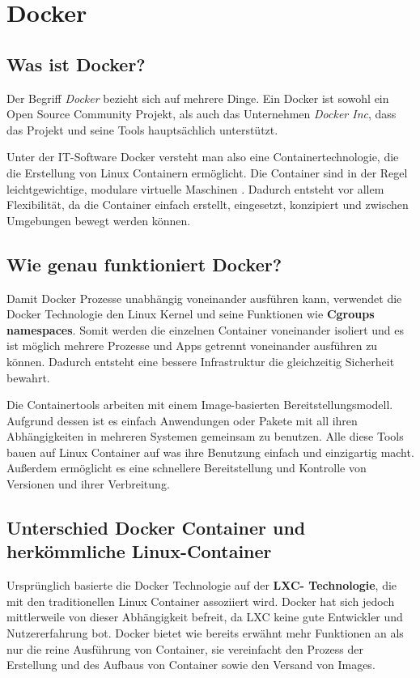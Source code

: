 \section{Docker}
\subsection{Was ist Docker?}
Der Begriff \textit{Docker} bezieht sich auf mehrere Dinge. Ein Docker ist sowohl ein Open Source
Community Projekt, als auch das Unternehmen \textit{Docker Inc}, dass das Projekt und seine Tools
hauptsächlich unterstützt.

Unter der IT-Software Docker versteht man also eine Containertechnologie, die die Erstellung von Linux
Containern ermöglicht. Die Container sind in der Regel leichtgewichtige, modulare virtuelle Maschinen
. Dadurch entsteht vor allem Flexibilität, da die Container einfach erstellt, eingesetzt, konzipiert
und zwischen Umgebungen bewegt werden können.

\subsection{Wie genau funktioniert Docker?}
Damit Docker Prozesse unabhängig voneinander ausführen kann, verwendet die Docker Technologie
den Linux Kernel und seine Funktionen wie \textbf{Cgroups} \textbf{namespaces}. Somit werden die
einzelnen Container voneinander isoliert und es ist möglich mehrere Prozesse und Apps getrennt
voneinander ausführen zu können. Dadurch entsteht eine bessere Infrastruktur die gleichzeitig
Sicherheit bewahrt.

Die Containertools arbeiten mit einem Image-basierten Bereitstellungsmodell. Aufgrund dessen ist es
einfach Anwendungen oder Pakete mit all ihren Abhängigkeiten in mehreren Systemen gemeinsam zu benutzen.
Alle diese Tools bauen auf Linux Container auf was ihre Benutzung einfach und einzigartig macht.
Außerdem ermöglicht es eine schnellere Bereitstellung und Kontrolle von Versionen und ihrer Verbreitung.

\subsection{Unterschied Docker Container und herkömmliche Linux-Container}
Ursprünglich basierte die Docker Technologie auf der \textbf{LXC- Technologie}, die mit den
traditionellen Linux Container assoziiert wird. Docker hat sich jedoch mittlerweile von dieser
Abhängigkeit befreit, da LXC keine gute Entwickler und Nutzererfahrung bot. Docker bietet wie bereits
erwähnt mehr Funktionen an als nur die reine Ausführung von Container, sie vereinfacht den Prozess der
Erstellung und des Aufbaus von Container sowie den Versand von Images.

